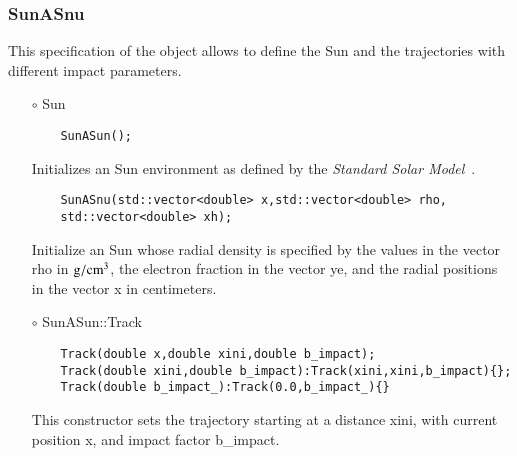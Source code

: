 \subsubsection{{SunASnu}}
This specification of the object allows to define the Sun and the
trajectories with different impact parameters.
\begin{itemize}
\item[$\circ$] {\ttf Sun}
  \begin{lstlisting}
    SunASun();
  \end{lstlisting}
  Initializes an {\ttf Sun} environment as defined by the {\it
    Standard Solar Model}~\citep{bahcall2005new}.
  \begin{lstlisting}
    SunASnu(std::vector<double> x,std::vector<double> rho,
    std::vector<double> xh);
  \end{lstlisting}
  Initialize an {\ttf Sun} whose radial density is specified by the
  values in the vector {\ttf rho} in ${\rm g}/{\rm cm}^3$, the
  electron fraction in the vector {\ttf ye}, and the radial positions
  in the vector {\ttf x} in centimeters. 
  
\item[$\circ$] {\ttf SunASun::Track}
  \begin{lstlisting}
    Track(double x,double xini,double b_impact);
    Track(double xini,double b_impact):Track(xini,xini,b_impact){};
    Track(double b_impact_):Track(0.0,b_impact_){}
  \end{lstlisting}
  This constructor sets the trajectory starting at a distance 
  {\ttf xini}, with current position {\ttf x}, and impact factor {\ttf
    b\_impact}.
\end{itemize}
